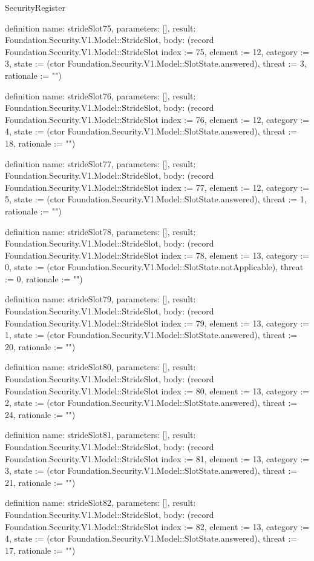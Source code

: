 \begin{lexlean}{SecurityRegister}
\begin{semanticmodule}
definition{
  name: strideSlot75,
  parameters: [],
  result: Foundation.Security.V1.Model::StrideSlot,
  body: (record Foundation.Security.V1.Model::StrideSlot {index := 75, element := 12, category := 3, state := (ctor Foundation.Security.V1.Model::SlotState.answered), threat := 3, rationale := ""})
}

definition{
  name: strideSlot76,
  parameters: [],
  result: Foundation.Security.V1.Model::StrideSlot,
  body: (record Foundation.Security.V1.Model::StrideSlot {index := 76, element := 12, category := 4, state := (ctor Foundation.Security.V1.Model::SlotState.answered), threat := 18, rationale := ""})
}

definition{
  name: strideSlot77,
  parameters: [],
  result: Foundation.Security.V1.Model::StrideSlot,
  body: (record Foundation.Security.V1.Model::StrideSlot {index := 77, element := 12, category := 5, state := (ctor Foundation.Security.V1.Model::SlotState.answered), threat := 1, rationale := ""})
}

definition{
  name: strideSlot78,
  parameters: [],
  result: Foundation.Security.V1.Model::StrideSlot,
  body: (record Foundation.Security.V1.Model::StrideSlot {index := 78, element := 13, category := 0, state := (ctor Foundation.Security.V1.Model::SlotState.notApplicable), threat := 0, rationale := ""})
}

definition{
  name: strideSlot79,
  parameters: [],
  result: Foundation.Security.V1.Model::StrideSlot,
  body: (record Foundation.Security.V1.Model::StrideSlot {index := 79, element := 13, category := 1, state := (ctor Foundation.Security.V1.Model::SlotState.answered), threat := 20, rationale := ""})
}

definition{
  name: strideSlot80,
  parameters: [],
  result: Foundation.Security.V1.Model::StrideSlot,
  body: (record Foundation.Security.V1.Model::StrideSlot {index := 80, element := 13, category := 2, state := (ctor Foundation.Security.V1.Model::SlotState.answered), threat := 24, rationale := ""})
}

definition{
  name: strideSlot81,
  parameters: [],
  result: Foundation.Security.V1.Model::StrideSlot,
  body: (record Foundation.Security.V1.Model::StrideSlot {index := 81, element := 13, category := 3, state := (ctor Foundation.Security.V1.Model::SlotState.answered), threat := 21, rationale := ""})
}

definition{
  name: strideSlot82,
  parameters: [],
  result: Foundation.Security.V1.Model::StrideSlot,
  body: (record Foundation.Security.V1.Model::StrideSlot {index := 82, element := 13, category := 4, state := (ctor Foundation.Security.V1.Model::SlotState.answered), threat := 17, rationale := ""})
}


\end{semanticmodule}
\end{lexlean}

